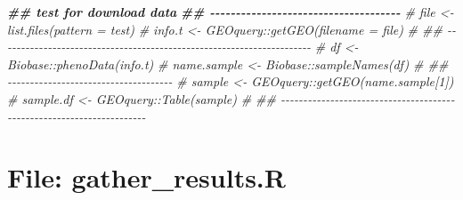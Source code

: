 \documentclass[
]{article}
\newenvironment{Shaded}{\begin{snugshade}}{\end{snugshade}}
\newcommand{\CommentTok}[1]{\textcolor[rgb]{0.56,0.35,0.01}{\textit{#1}}}
\newcommand{\DocumentationTok}[1]{\textcolor[rgb]{0.56,0.35,0.01}{\textbf{\textit{#1}}}}
\begin{document}
\begin{Shaded}
\begin{Highlighting}[]
\DocumentationTok{\#\# test for download data}
\DocumentationTok{\#\# {-}{-}{-}{-}{-}{-}{-}{-}{-}{-}{-}{-}{-}{-}{-}{-}{-}{-}{-}{-}{-}{-}{-}{-}{-}{-}{-}{-}{-}{-}{-}{-}{-}{-}{-}{-}{-} }
\CommentTok{\# file \textless{}{-} list.files(pattern = test)}
\CommentTok{\# info.t \textless{}{-} GEOquery::getGEO(filename = file)}
\CommentTok{\# \#\# {-}{-}{-}{-}{-}{-}{-}{-}{-}{-}{-}{-}{-}{-}{-}{-}{-}{-}{-}{-}{-}{-}{-}{-}{-}{-}{-}{-}{-}{-}{-}{-}{-}{-}{-}{-}{-}{-}{-}{-}{-}{-}{-}{-}{-}{-}{-}{-}{-}{-}{-}{-}{-}{-}{-}{-}{-}{-}{-}{-}{-}{-}{-}{-}{-}{-}{-}{-}{-}{-} }
\CommentTok{\# df \textless{}{-} Biobase::phenoData(info.t)}
\CommentTok{\# name.sample \textless{}{-} Biobase::sampleNames(df)}
\CommentTok{\# \#\# {-}{-}{-}{-}{-}{-}{-}{-}{-}{-}{-}{-}{-}{-}{-}{-}{-}{-}{-}{-}{-}{-}{-}{-}{-}{-}{-}{-}{-}{-}{-}{-}{-}{-}{-}{-}{-} }
\CommentTok{\# sample \textless{}{-} GEOquery::getGEO(name.sample[1])}
\CommentTok{\# sample.df \textless{}{-} GEOquery::Table(sample)}
\CommentTok{\# \#\# {-}{-}{-}{-}{-}{-}{-}{-}{-}{-}{-}{-}{-}{-}{-}{-}{-}{-}{-}{-}{-}{-}{-}{-}{-}{-}{-}{-}{-}{-}{-}{-}{-}{-}{-}{-}{-}{-}{-}{-}{-}{-}{-}{-}{-}{-}{-}{-}{-}{-}{-}{-}{-}{-}{-}{-}{-}{-}{-}{-}{-}{-}{-}{-}{-}{-}{-}{-}{-}{-} }
\end{Highlighting}
\end{Shaded}

\hypertarget{file-gather_results.r}{%
\section{File: gather\_results.R}\label{file-gather_results.r}}
\end{document}

